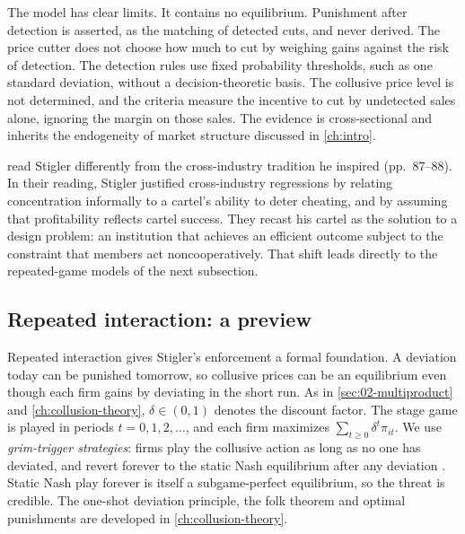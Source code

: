 The model has clear limits. It contains no equilibrium. Punishment after detection is asserted, as the matching of
detected cuts, and never derived. The price cutter does not choose how much to cut by weighing gains against the
risk of detection. The detection rules use fixed probability thresholds, such as one standard deviation, without a
decision-theoretic basis. The collusive price level is not determined, and the criteria measure the incentive to cut
by undetected sales alone, ignoring the margin on those sales. The evidence is cross-sectional and inherits the
endogeneity of market structure discussed in \cref{ch:intro}.

\citet{GreenPorter1984} read Stigler differently from the cross-industry tradition he inspired (pp.~87--88). In their
reading, Stigler justified cross-industry regressions by relating concentration informally to a cartel's ability to
deter cheating, and by assuming that profitability reflects cartel success. They recast his cartel as the solution
to a design problem: an institution that achieves an efficient outcome subject to the constraint that members act
noncooperatively. That shift leads directly to the repeated-game models of the next subsection.

\subsection{Repeated interaction: a preview}\label{sec:02-repeated}

Repeated interaction gives Stigler's enforcement a formal foundation. A deviation today can be punished tomorrow,
so collusive prices can be an equilibrium even though each firm gains by deviating in the short run. As in
\cref{sec:02-multiproduct} and \cref{ch:collusion-theory}, $\delta \in (0, 1)$ denotes the discount factor. The
stage game is played in periods $t = 0, 1, 2, \dots$, and each firm maximizes $\sum_{t \ge 0}\delta^t\pi_{it}$. We
use \emph{grim-trigger strategies}: firms play the collusive action as long as no one has deviated, and revert
forever to the static Nash equilibrium after any deviation \citep{Friedman1971}. Static Nash play forever is itself
a subgame-perfect equilibrium, so the threat is credible. The one-shot deviation principle, the folk theorem and
optimal punishments are developed in \cref{ch:collusion-theory}.

